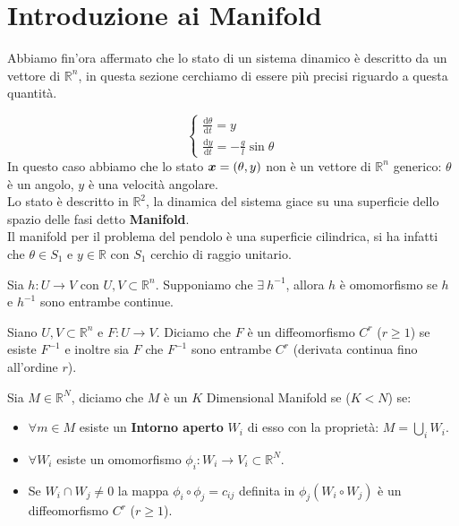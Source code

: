 \section{Introduzione ai Manifold}%
\label{sub:Introduzione ai Manifold}
Abbiamo fin'ora affermato che lo stato di un sistema dinamico è descritto da un vettore di $\mathbb{R}^n$, in questa sezione cerchiamo di essere più precisi riguardo a questa quantità.
\begin{exmp}
    \[
        \begin{cases}
            \frac{\text{d} \theta}{\text{d} t} = y\\
	    \frac{\text{d} y}{\text{d} t} = -\frac{g}{l}\sin\theta
        \end{cases}
    \] 
    In questo caso abbiamo che lo stato $\boldsymbol{x} = (\theta, y)$ non è un vettore di $\mathbb{R}^n$ generico: $\theta$ è un angolo, $y$ è una velocità angolare.\\
    Lo stato è descritto in $\mathbb{R}^2$, la dinamica del sistema giace su una superficie dello spazio delle fasi detto \textbf{Manifold}.\\
    Il manifold per il problema del pendolo è una superficie cilindrica, si ha infatti che $\theta\in S_1$ e $y \in \mathbb{R}$ con $S_1$ cerchio di raggio unitario.
\end{exmp}
\noindent
\begin{defn}[Omomorfismo]
    Sia $h: U\to V$ con $U, V \subset \mathbb{R}^n$. Supponiamo che $\exists \ h^{-1}$, allora $h$ è omomorfismo se $h$ e $h^{-1}$ sono entrambe continue.
\end{defn}
\noindent 
\begin{defn}[Diffeomorfismo $C^r$]
    Siano $U, V \subset \mathbb{R}^n$ e $F:U\to V$. Diciamo che $F$ è un diffeomorfismo $C^r$ ($r\ge 1$) se esiste $F^{-1}$ e inoltre sia $F$ che $F^{-1}$ sono entrambe $C^r$ (derivata continua fino all'ordine $r$).
\end{defn}
\noindent
\begin{defn}
    Sia $M \in \mathbb{R}^N$, diciamo che $M$ è un $K$ Dimensional Manifold se ($K<N$) se:
    \begin{itemize}
	\item $\forall m \in M $ esiste un \textbf{Intorno aperto} $W_i$ di esso con la proprietà: $M = \bigcup_i W_i$.
	\item $\forall W_i$ esiste un omomorfismo $\phi_i: W_i \to V_i \subset \mathbb{R}^N$.
	\item Se $W_i \cap W_j \neq 0$ la mappa $\phi_i \circ \phi_j = c_{ij}$  definita in $\phi_j(W_i \circ W_j)$ è un diffeomorfismo $C^r$ ($r\ge 1$).
    \end{itemize}
\end{defn}
